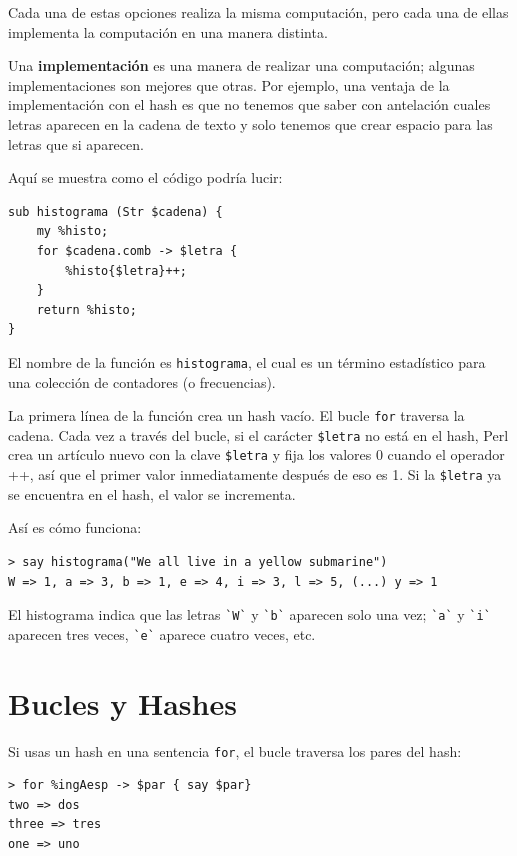 Cada una de estas opciones realiza la misma computación,
pero cada una de ellas implementa la computación en una
manera distinta.

Una {\bf implementación} es una manera de realizar una computación;
algunas implementaciones son mejores que otras. Por ejemplo,
una ventaja de la implementación con el hash es que no tenemos
que saber con antelación cuales letras aparecen en la 
cadena de texto y solo tenemos que crear espacio para las letras
que si aparecen.

Aquí se muestra como el código podría lucir:

\begin{lstlisting}
sub histograma (Str $cadena) {
    my %histo;
    for $cadena.comb -> $letra {
        %histo{$letra}++;
    }
    return %histo;
}
\end{lstlisting}
%
El nombre de la función es {\tt histograma}, el cual es
un término estadístico para una colección de contadores (o frecuencias).

La primera línea de la función crea un hash vacío.
El bucle {\tt for} traversa la cadena. Cada vez a través
del bucle, si el carácter \verb|$letra| no está en el hash, Perl
crea un artículo nuevo con la clave \verb|$letra| y fija los 
valores 0 cuando el operador ++, así que el primer valor 
inmediatamente después de eso es 1. Si la \verb|$letra| 
ya se encuentra en el hash, el valor se incrementa.

Así es cómo funciona:

\begin{lstlisting}
> say histograma("We all live in a yellow submarine")
W => 1, a => 3, b => 1, e => 4, i => 3, l => 5, (...) y => 1
\end{lstlisting}
%
El histograma indica que las letras \verb|`W`| y \verb|`b`|
aparecen solo una vez; \verb|`a`| y \verb|`i`| aparecen
tres veces, \verb|`e`| aparece cuatro veces, etc.

\section{Bucles y Hashes}

Si usas un hash en una sentencia {\tt for}, el bucle 
traversa los pares del hash:

\begin{lstlisting}
> for %ingAesp -> $par { say $par}
two => dos
three => tres
one => uno
\end{lstlisting}
%

